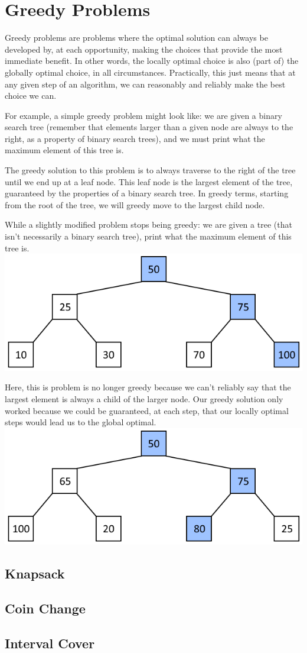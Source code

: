 \section{Greedy Problems}

Greedy problems are problems where the optimal solution can always be developed by, at each opportunity, making the choices that provide the most immediate benefit. In other words, the locally optimal choice is also (part of) the globally optimal choice, in all circumstances. Practically, this just means that at any given step of an algorithm, we can reasonably and reliably make the best choice we can.

For example, a simple greedy problem might look like: we are given a binary search tree (remember that elements larger than a given node are always to the right, as a property of binary search trees), and we must print what the maximum element of this tree is.

The greedy solution to this problem is to always traverse to the right of the tree until we end up at a leaf node. This leaf node is the largest element of the tree, guaranteed by the properties of a binary search tree. In greedy terms, starting from the root of the tree, we will greedy move to the largest child node.

While a slightly modified problem stops being greedy: we are given a tree (that isn't necessarily a binary search tree), print what the maximum element of this tree is.
{\centering \includegraphics{images/greedy/greedy_tree_1.png}}

Here, this is problem is no longer greedy because we can't reliably say that the largest element is always a child of the larger node. Our greedy solution only worked because we could be guaranteed, at each step, that our locally optimal steps would lead us to the global optimal.
{\centering \includegraphics{images/greedy/greedy_tree_2.png}}

\subsection{Knapsack}

\subsection{Coin Change}

\subsection{Interval Cover}